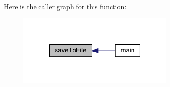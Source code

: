 Here is the caller graph for this function\-:
\nopagebreak
\begin{figure}[H]
\begin{center}
\leavevmode
\includegraphics[width=220pt]{a00068_acac21f7e718db9d00451e3caaaacc25f_icgraph}
\end{center}
\end{figure}


